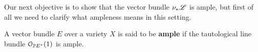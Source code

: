 	Our next objective is to show that the vector bundle $\nu_{*} \mathscr{L}$ is ample, but first of all we need to clarify what ampleness means in this setting.
	\begin{defi}
		A vector bundle $E$ over a variety $X$ is said to be \textbf{ample} if the tautological line bundle $\mathcal{O}_{\mathbb{P} E^*}(1)$ is ample.

	\end{defi}


